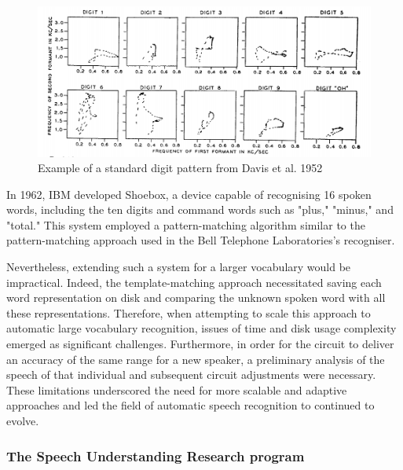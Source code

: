 \begin{figure}[h]
\includegraphics[width=\textwidth]{imgs/bell.png}
\caption{Example of a standard digit pattern from Davis et al. 1952}
\label{Bell}
\end{figure}



In 1962, IBM developed Shoebox, a device capable of recognising 16 spoken words, including the ten digits and command words such as "plus," "minus," and "total." This system employed a pattern-matching algorithm similar to the pattern-matching approach used in the Bell Telephone Laboratories's recogniser.


Nevertheless, extending such a system for a larger vocabulary would be impractical. Indeed, the template-matching approach necessitated saving each word representation on disk and comparing the unknown spoken word with all these representations. Therefore, when attempting to scale this approach to automatic large vocabulary recognition, issues of time and disk usage complexity emerged as significant challenges. Furthermore, in order for the circuit to deliver an accuracy of the same range for a new speaker, a preliminary analysis of the speech of that individual and subsequent circuit adjustments were necessary. These limitations underscored the need for more scalable and adaptive approaches and led the field of automatic speech recognition to continued to evolve.



\subsubsection{The Speech Understanding Research program} 

